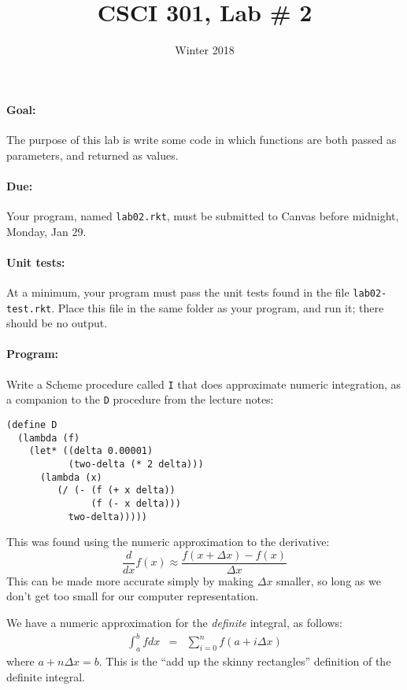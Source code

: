 \documentclass{article}
\title{CSCI 301, Lab \# 2}
\author{Winter 2018}
\date{}
\begin{document}
\maketitle
\begin{multicols}{2}


\paragraph{Goal:} The purpose of this lab is write some  code in 
  which functions are both passed as parameters, and returned as values. 

\paragraph{Due:} Your program, named {\tt lab02.rkt}, must be submitted to
  Canvas before midnight, Monday, Jan 29.

  \paragraph{Unit tests:}
  At a minimum, your program must pass the unit tests found in the
  file {\tt lab02-test.rkt}.  Place this file in the same folder
  as your program, and run it;  there should be no output.

\paragraph{Program:} Write a {\sc Scheme} procedure called {\tt I} that
  does approximate numeric integration, as a companion to the {\tt D}
  procedure from the lecture notes:
  \begin{Verbatim}[frame=single]
(define D
  (lambda (f)
    (let* ((delta 0.00001)
           (two-delta (* 2 delta)))
      (lambda (x)
         (/ (- (f (+ x delta))
               (f (- x delta)))
           two-delta)))))
  \end{Verbatim}
  This was found using the numeric approximation to the derivative:
  \[
  \frac{d}{dx} f(x) \approx \frac{f(x+\Delta x) - f(x)}{\Delta x}
  \]
  This can be made more accurate simply by making $\Delta x$ smaller,
  so long as we don't get too small for our computer representation.
  
  We have a numeric approximation for the {\em definite} integral, as
  follows:
\begin{eqnarray}
  \int_a^b f dx  &=&  \sum _{i=0}^{n} f(a+i\Delta x) \label{summation}
\end{eqnarray}
where $a+n\Delta x = b$.  This is the ``add up the skinny rectangles''
definition of the definite integral.


\end{multicols}
\end{document}
